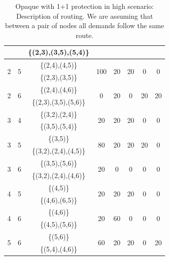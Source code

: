 \begin{table}[h!]
\begin{tabular}{|| c | c | c | c | c | c | c | c ||}
 & & \{(2,3),(3,5),(5,4)\} & & & & &\\ \hline
 \multirow{2}{*}{2} & \multirow{2}{*}{5} & \{(2,4),(4,5)\} & \multirow{2}{*}{100} & \multirow{2}{*}{20} & \multirow{2}{*}{20} & \multirow{2}{*}{0} & \multirow{2}{*}{0}\\
 & & \{(2,3),(3,5)\} & & & & &\\ \hline
 \multirow{2}{*}{2} & \multirow{2}{*}{6} & \{(2,4),(4,6)\} & \multirow{2}{*}{0} & \multirow{2}{*}{20} & \multirow{2}{*}{0} & \multirow{2}{*}{20} & \multirow{2}{*}{20}\\
 & & \{(2,3),(3,5),(5,6)\} & & & & &\\ \hline
 \multirow{2}{*}{3} & \multirow{2}{*}{4} & \{(3,2),(2,4)\} & \multirow{2}{*}{20} & \multirow{2}{*}{20} & \multirow{2}{*}{20} & \multirow{2}{*}{0} & \multirow{2}{*}{0}\\
 & & \{(3,5),(5,4)\} & & & & &\\ \hline
 \multirow{2}{*}{3} & \multirow{2}{*}{5} & \{(3,5)\} & \multirow{2}{*}{80} & \multirow{2}{*}{20} & \multirow{2}{*}{20} & \multirow{2}{*}{20} & \multirow{2}{*}{0}\\
 & & \{(3,2),(2,4),(4,5)\} & & & & &\\ \hline
 \multirow{2}{*}{3} & \multirow{2}{*}{6} & \{(3,5),(5,6)\} & \multirow{2}{*}{20} & \multirow{2}{*}{0} & \multirow{2}{*}{0} & \multirow{2}{*}{0} & \multirow{2}{*}{0}\\
 & & \{(3,2),(2,4),(4,6)\} & & & & &\\ \hline
 \multirow{2}{*}{4} & \multirow{2}{*}{5} & \{(4,5)\} & \multirow{2}{*}{20} & \multirow{2}{*}{20} & \multirow{2}{*}{20} & \multirow{2}{*}{0} & \multirow{2}{*}{0}\\
 & & \{(4,6),(6,5)\} & & & & &\\ \hline
 \multirow{2}{*}{4} & \multirow{2}{*}{6} & \{(4,6)\} & \multirow{2}{*}{20} & \multirow{2}{*}{60} & \multirow{2}{*}{0} & \multirow{2}{*}{0} & \multirow{2}{*}{0}\\
 & & \{(4,5),(5,6)\} & & & & &\\ \hline
 \multirow{2}{*}{5} & \multirow{2}{*}{6} & \{(5,6)\} & \multirow{2}{*}{60} & \multirow{2}{*}{20} & \multirow{2}{*}{20} & \multirow{2}{*}{0} & \multirow{2}{*}{20}\\
 & & \{(5,4),(4,6)\} & & & & &\\
 \hline
\end{tabular}
\caption{Opaque with 1+1 protection in high scenario: Description of routing. We are assuming that between a pair of nodes all demands follow the same route.}
\label{path_opaque_protec_ref_high}
\end{table}

